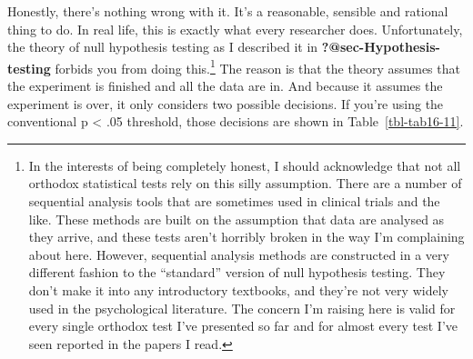 \documentclass[
  a4paper,
]{book}
\begin{document}
Honestly, there's nothing wrong with it. It's a reasonable, sensible and
rational thing to do. In real life, this is exactly what every
researcher does. Unfortunately, the theory of null hypothesis testing as
I described it in \textbf{?@sec-Hypothesis-testing} forbids you from
doing this.\footnote{In the interests of being completely honest, I
  should acknowledge that not all orthodox statistical tests rely on
  this silly assumption. There are a number of sequential analysis tools
  that are sometimes used in clinical trials and the like. These methods
  are built on the assumption that data are analysed as they arrive, and
  these tests aren't horribly broken in the way I'm complaining about
  here. However, sequential analysis methods are constructed in a very
  different fashion to the ``standard'' version of null hypothesis
  testing. They don't make it into any introductory textbooks, and
  they're not very widely used in the psychological literature. The
  concern I'm raising here is valid for every single orthodox test I've
  presented so far and for almost every test I've seen reported in the
  papers I read.} The reason is that the theory assumes that the
experiment is finished and all the data are in. And because it assumes
the experiment is over, it only considers two possible decisions. If
you're using the conventional p \textless{} .05 threshold, those
decisions are shown in Table~\ref{tbl-tab16-11}.

\hypertarget{tbl-tab16-11}{}
 
  \providecommand{\huxb}[2]{\arrayrulecolor[RGB]{#1}\global\arrayrulewidth=#2pt}
  \providecommand{\huxvb}[2]{\color[RGB]{#1}\vrule width #2pt}
  \providecommand{\huxtpad}[1]{\rule{0pt}{#1}}
  \providecommand{\huxbpad}[1]{\rule[-#1]{0pt}{#1}}
\end{document}
